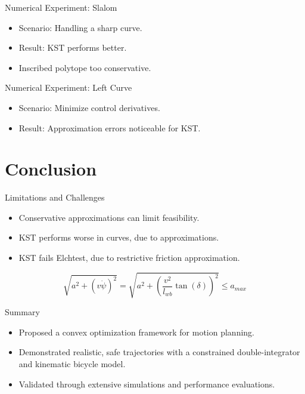 \documentclass[shortpres,aspectratio=43]{beamer}
\begin{document}
\begin{frame}{Numerical Experiment: Slalom}
  \begin{itemize}
    \item Scenario: Handling a sharp curve.
    \item Result: KST performs better.
    \item Inscribed polytope too conservative.
  \end{itemize}
\end{frame}

\begin{frame}{Numerical Experiment: Left Curve}
  \begin{itemize}
    \item Scenario: Minimize control derivatives.
    \item Result: Approximation errors noticeable for KST.
  \end{itemize}
\end{frame}

\section{Conclusion}

\begin{frame}{Limitations and Challenges}
  \begin{itemize}
    \item Conservative approximations can limit feasibility.
    \item KST performs worse in curves, due to approximations.
    \item KST fails Elchtest, due to restrictive friction approximation.
  \end{itemize}
  \begin{equation}
    \sqrt{a^2 + \left(v\dot{\psi}\right)^2} = \sqrt{a^2 + \left(\frac{v^2}{l_{wb}} \tan(\delta)\right)^2} \leq a_{max}
  \end{equation}
\end{frame}

\begin{frame}{Summary}
  \begin{itemize}
    \item Proposed a convex optimization framework for motion planning.
    \item Demonstrated realistic, safe trajectories with a constrained double-integrator and kinematic bicycle model.
    \item Validated through extensive simulations and performance evaluations.
  \end{itemize}
\end{frame}
\end{document}
